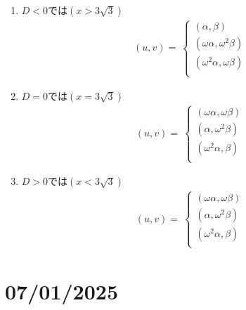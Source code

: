 \documentclass[dvipdfmx]{report} %
\begin{document}
\begin{enumerate}[(1)\,]
\item{$D < 0 $では$(x > 3 \sqrt{3})$}
\begin{equation*}
\begin{split}
	( u, v ) =\
		\begin{cases}
			( \alpha, \beta )\\
			( \omega\alpha, \omega^2 \beta )\\
			( \omega^2 \alpha, \omega\beta )\\
		\end{cases}
\end{split}
\end{equation*}

\item{$D = 0 $では$(x = 3 \sqrt{3})$}
\begin{equation*}
\begin{split}
	( u, v ) =\
		\begin{cases}
			( \omega\alpha, \omega\beta )\\
			( \alpha, \omega^2 \beta )\\
			( \omega^2 \alpha, \beta )\\
		\end{cases}
\end{split}
\end{equation*}

\item{$D > 0 $では$(x < 3 \sqrt{3})$}
\begin{equation*}
\begin{split}
	( u, v ) =\
		\begin{cases}
			( \omega\alpha, \omega\beta )\\
			( \alpha, \omega^2 \beta )\\
			( \omega^2 \alpha, \beta )\\
		\end{cases}
\end{split}
\end{equation*}
\end{enumerate}

\chapter{07/01/2025}
\end{document}
